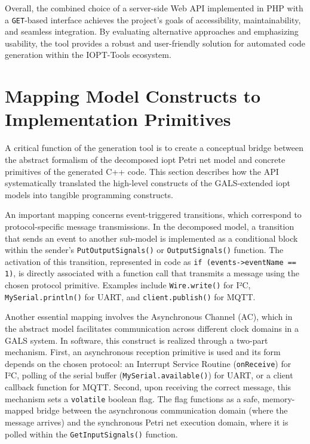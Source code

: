 Overall, the combined choice of a server-side Web API implemented in PHP with a \texttt{GET}-based interface achieves the project's goals of accessibility, maintainability, and seamless integration. By evaluating alternative approaches and emphasizing usability, the tool provides a robust and user-friendly solution for automated code generation within the IOPT-Tools ecosystem.




\section{Mapping Model Constructs to Implementation Primitives}
\label{sec:mapping_constructs}

A critical function of the generation tool is to create a conceptual bridge between the abstract formalism of the decomposed \gls{iopt} Petri net model and concrete primitives of the generated C++ code. This section describes how the API systematically translated the high-level constructs of the GALS-extended \gls{iopt} models into tangible programming constructs.

An important mapping concerns event-triggered transitions, which correspond to protocol-specific message transmissions. In the decomposed model, a transition that sends an event to another sub-model is implemented as a conditional block within the sender's \texttt{PutOutputSignals()} or \texttt{OutputSignals()} function. The activation of this transition, represented in code as \texttt{if (events->eventName == 1)}, is directly associated with a function call that transmits a message using the chosen protocol primitive. Examples include \texttt{Wire.write()} for I²C, \texttt{MySerial.println()} for UART, and \texttt{client.publish()} for MQTT.

Another essential mapping involves the Asynchronous Channel (AC), which in the abstract model facilitates communication across different clock domains in a GALS system. In software, this construct is realized through a two-part mechanism. First, an asynchronous reception primitive is used and its form depends on the chosen protocol: an Interrupt Service Routine (\texttt{onReceive}) for I²C, polling of the serial buffer (\texttt{MySerial.available()}) for UART, or a client callback function for MQTT. Second, upon receiving the correct message, this mechanism sets a \texttt{volatile} boolean flag. The flag functions as a safe, memory-mapped bridge between the asynchronous communication domain (where the message arrives) and the synchronous Petri net execution domain, where it is polled within the \texttt{GetInputSignals()} function.

